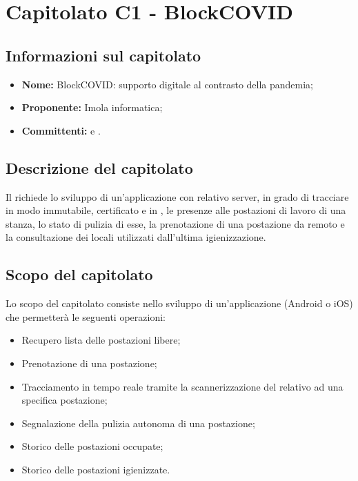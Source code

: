 \section{Capitolato C1 - BlockCOVID}\label{C1}
\subsection{Informazioni sul capitolato}
\begin{itemize}
	\item \textbf{Nome:} BlockCOVID: supporto digitale al contrasto della pandemia;
	\item \textbf{Proponente:} Imola informatica;
	\item \textbf{Committenti:} \VT{} e \CR{}.
\end{itemize}

\subsection{Descrizione del capitolato}
Il  richiede lo sviluppo di un'applicazione con relativo server, in grado di tracciare in modo immutabile, certificato e in , le presenze alle postazioni di lavoro di una stanza, lo stato di pulizia di esse, la prenotazione di una postazione da remoto e la consultazione dei locali utilizzati dall'ultima igienizzazione.

\subsection{Scopo del capitolato}
Lo scopo del capitolato consiste nello sviluppo di un'applicazione (Android o iOS) che permetterà le seguenti operazioni:
\begin{itemize}
	\item Recupero lista delle postazioni libere;
	\item Prenotazione di una postazione;
	\item Tracciamento in tempo reale tramite la scannerizzazione del  relativo ad una specifica postazione;
	\item Segnalazione della pulizia autonoma di una postazione;
	\item Storico delle postazioni occupate;
	\item Storico delle postazioni igienizzate.
\end{itemize}

